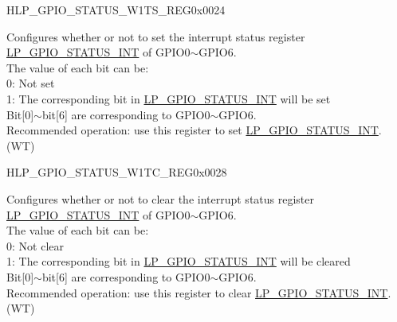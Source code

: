 \begin{register}{H}{LP\_GPIO\_STATUS\_W1TS\_REG}{0x0024}\label{regdesc:LPGPIOSTATUSW1TSREG}
%
%
\regnewline%
\begin{regdesc}\begin{reglist}
\label{fielddesc:LPGPIOSTATUSW1TS}\item [LP\_GPIO\_STATUS\_W1TS] Configures whether or not to set the interrupt status register \hyperref[regdesc:LPGPIOSTATUSREG]{LP\_GPIO\_STATUS\_INT} of GPIO0$\sim$GPIO6.\\
The value of each bit can be:\\
0: Not set\\
1: The corresponding bit in \hyperref[regdesc:LPGPIOSTATUSREG]{LP\_GPIO\_STATUS\_INT} will be set\\
Bit[0]$\sim$bit[6] are corresponding to GPIO0$\sim$GPIO6.\\
Recommended operation: use this register to set \hyperref[regdesc:LPGPIOSTATUSREG]{LP\_GPIO\_STATUS\_INT}. \\
(WT)
\end{reglist}\end{regdesc}
\end{register}


\begin{register}{H}{LP\_GPIO\_STATUS\_W1TC\_REG}{0x0028}\label{regdesc:LPGPIOSTATUSW1TCREG}
%
%
\regnewline%
\begin{regdesc}\begin{reglist}
\label{fielddesc:LPGPIOSTATUSW1TC}\item [LP\_GPIO\_STATUS\_W1TC] Configures whether or not to clear the interrupt status register \hyperref[regdesc:LPGPIOSTATUSREG]{LP\_GPIO\_STATUS\_INT} of GPIO0$\sim$GPIO6. \\
The value of each bit can be:\\
0: Not clear\\
1: The corresponding bit in \hyperref[regdesc:LPGPIOSTATUSREG]{LP\_GPIO\_STATUS\_INT} will be cleared\\
Bit[0]$\sim$bit[6] are corresponding to GPIO0$\sim$GPIO6.\\
Recommended operation: use this register to clear \hyperref[regdesc:LPGPIOSTATUSREG]{LP\_GPIO\_STATUS\_INT}.\\
(WT)
\end{reglist}\end{regdesc}
\end{register}


